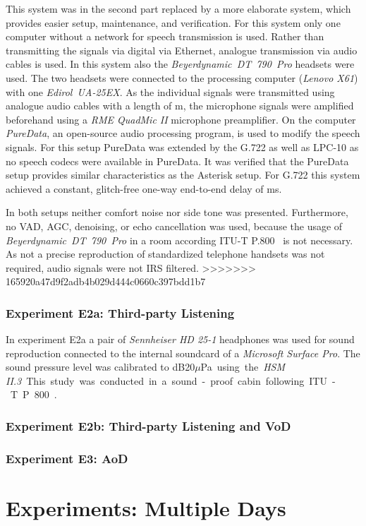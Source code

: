 This system was in the second part replaced by a more elaborate system, which provides easier setup, maintenance, and verification.
For this system only one computer without a network for speech transmission is used.
Rather than transmitting the signals via digital via Ethernet, analogue transmission via audio cables is used.
In this system also the \emph{Beyerdynamic~DT~790~Pro} headsets were used.
The two headsets were connected to the processing computer (\emph{Lenovo X61}) with one \emph{Edirol~UA-25EX}.
As the individual signals were transmitted using analogue audio cables with a length of \unit[10]{m}, the microphone signals were amplified beforehand using a \emph{RME QuadMic II} microphone preamplifier.
On the computer \emph{PureData}, an open-source audio processing program, is used to modify the speech signals.
For this setup PureData was extended by the G.722 as well as LPC-10 as no speech codecs were available in PureData.
It was verified that the PureData setup provides similar characteristics as the Asterisk setup.
For G.722 this system achieved a constant, glitch-free one-way end-to-end delay of \unit[70]{ms}.

In both setups neither comfort noise nor side tone was presented.
Furthermore, no \ac{VAD}, \ac{AGC}, denoising, or echo cancellation was used, because the usage of \emph{Beyerdynamic~DT~790~Pro} in a room according ITU-T P.800~\citep{itu-t_p.800:_1996} is not necessary.
As not a precise reproduction of standardized telephone handsets was not required, audio signals were not IRS filtered.
>>>>>>> 165920a47d9f2adb4b029d444c0660c397bdd1b7

\subsubsection{Experiment E2a: Third-party Listening}
In experiment E2a a pair of \emph{Sennheiser HD 25-1} headphones was used for sound reproduction connected to the internal soundcard of a \emph{Microsoft Surface Pro}.
The sound pressure level was calibrated to \unit[75]{dB20$\mu$Pa} using the \emph{HSM II.3}.
This study was conducted in a sound-proof cabin following ITU-T P.800~\citep{itu-t_p.800:_1996}.

\subsubsection{Experiment E2b: Third-party Listening and \ac{VoD}}


\subsubsection{Experiment E3: \ac{AoD}}


\section{Experiments: Multiple Days}



